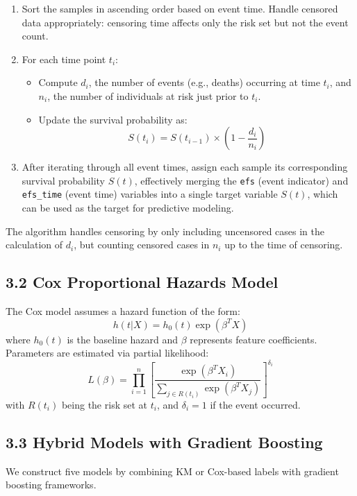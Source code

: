 \documentclass[11pt]{article}
\begin{document}
\begin{enumerate}
  \item Sort the samples in ascending order based on event time. Handle censored data appropriately: censoring time affects only the risk set but not the event count.
  
  \item For each time point $t_i$:
  \begin{itemize}
    \item Compute $d_i$, the number of events (e.g., deaths) occurring at time $t_i$, and $n_i$, the number of individuals at risk just prior to $t_i$.
    \item Update the survival probability as:
    \[
    S(t_i) = S(t_{i-1}) \times \left(1 - \frac{d_i}{n_i}\right)
    \]
  \end{itemize}
  
  \item After iterating through all event times, assign each sample its corresponding survival probability $S(t)$, effectively merging the \texttt{efs} (event indicator) and \texttt{efs\_time} (event time) variables into a single target variable $S(t)$, which can be used as the target for predictive modeling.
\end{enumerate}

\noindent The algorithm handles censoring by only including uncensored cases in the calculation of $d_i$, but counting censored cases in $n_i$ up to the time of censoring.

\subsection*{3.2 Cox Proportional Hazards Model}
The Cox model assumes a hazard function of the form:
\[
h(t|X) = h_0(t) \exp(\beta^T X)
\]
where $h_0(t)$ is the baseline hazard and $\beta$ represents feature coefficients. Parameters are estimated via partial likelihood:
\[
L(\beta) = \prod_{i=1}^{n} \left[\frac{\exp(\beta^T X_i)}{\sum_{j \in R(t_i)} \exp(\beta^T X_j)}\right]^{\delta_i}
\]
with $R(t_i)$ being the risk set at $t_i$, and $\delta_i = 1$ if the event occurred.

\subsection*{3.3 Hybrid Models with Gradient Boosting}
We construct five models by combining KM or Cox-based labels with gradient boosting frameworks. \\
\end{document}
